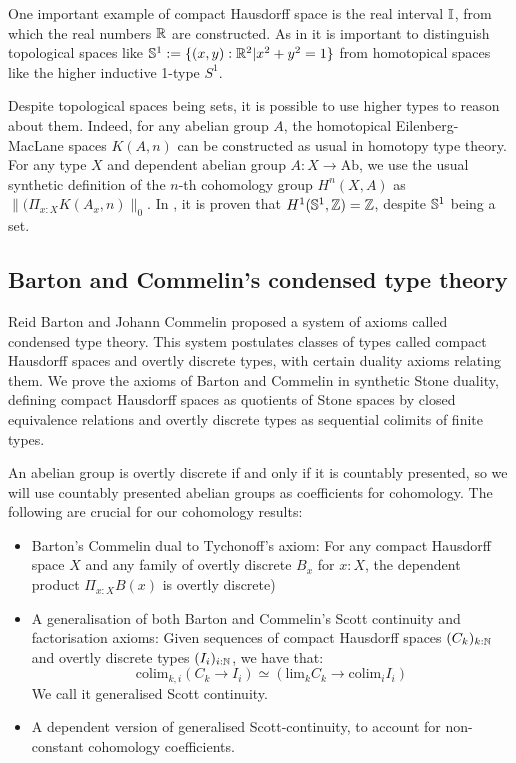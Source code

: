 \documentclass{../util/zariski}
\begin{document}
One important example of compact Hausdorff space is the real interval $\mathbb{I}$, from which the real numbers $\mathbb{R}$ are constructed.
As in \cite{shulman-Brouwer-fixed-point} it is important to distinguish topological spaces like $\mathbb{S}^1:=\{(x,y):\mathbb{R}^2\vert x^2+y^2=1\}$ from homotopical spaces like the higher inductive 1-type $S^1$.

Despite topological spaces being sets, it is possible to use higher types to reason about them. Indeed, for any abelian group $A$, the homotopical Eilenberg-MacLane spaces $K(A,n)$ can be constructed as usual in homotopy type theory. For any type $X$ and dependent abelian group $A:X\to \mathrm{Ab}$, we use the usual synthetic definition of the $n$-th cohomology group $H^n(X,A)$ as $\|(\Pi_{x:X}K(A_x,n)\|_0$. In \cite{synthetic-stone-duality}, it is proven that $H^1(\mathbb{S}^1,\mathbb{Z})=\mathbb{Z}$, despite $\mathbb{S}^1$ being a set.

\subsection*{Barton and Commelin's condensed type theory}

Reid Barton and Johann Commelin proposed a system of axioms called condensed type theory. This system postulates classes of types called compact Hausdorff spaces and overtly discrete types, with certain duality axioms relating them. We prove the axioms of Barton and Commelin in synthetic Stone duality, defining compact Hausdorff spaces as quotients of Stone spaces by closed equivalence relations and overtly discrete types as sequential colimits of finite types.

An abelian group is overtly discrete if and only if it is countably presented, so we will use countably presented abelian groups as coefficients for cohomology. The following are crucial for our cohomology results:
\begin{itemize} 
\item Barton's Commelin dual to Tychonoff's axiom: For any compact Hausdorff space $X$ and any family of overtly discrete $B_x$ for $x:X$, the dependent product $\Pi_{x:X}B(x)$ is overtly discrete) 
\item A generalisation of both Barton and Commelin's Scott continuity and factorisation axioms: Given sequences of compact Hausdorff spaces $(C_k)_{k:\mathbb{N}}$ and overtly discrete types $(I_i)_{i:\mathbb{N}}$, we have that:
\[\mathrm{colim}_{k,i}(C_k\to I_i) \simeq \left(\mathrm{lim}_kC_k \to \mathrm{colim}_iI_i\right)\]
We call it generalised Scott continuity.
\item A dependent version of generalised Scott-continuity, to account for non-constant cohomology coefficients.
\end{itemize}
\end{document}
